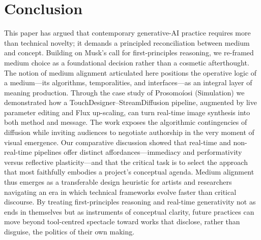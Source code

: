 \documentclass[sigconf,nonacm]{acmart}
\begin{document}
\section{Conclusion}
This paper has argued that contemporary generative-AI practice requires more than technical novelty; it demands a principled reconciliation between medium and concept. Building on Musk's call for first-principles reasoning, we re-framed medium choice as a foundational decision rather than a cosmetic afterthought. The notion of medium alignment articulated here positions the operative logic of a medium—its algorithms, temporalities, and interfaces—as an integral layer of meaning production.
Through the case study of Prosomoíosi (Simulation) we demonstrated how a TouchDesigner–StreamDiffusion pipeline, augmented by live parameter editing and Flux up-scaling, can turn real-time image synthesis into both method and message. The work exposes the algorithmic contingencies of diffusion while inviting audiences to negotiate authorship in the very moment of visual emergence. Our comparative discussion showed that real-time and non-real-time pipelines offer distinct affordances—immediacy and performativity versus reflective plasticity—and that the critical task is to select the approach that most faithfully embodies a project's conceptual agenda.
Medium alignment thus emerges as a transferable design heuristic for artists and researchers navigating an era in which technical frameworks evolve faster than critical discourse. By treating first-principles reasoning and real-time generativity not as ends in themselves but as instruments of conceptual clarity, future practices can move beyond tool-centred spectacle toward works that disclose, rather than disguise, the politics of their own making.
\end{document}
